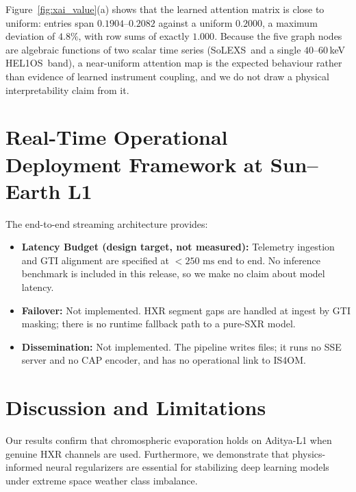 \documentclass[11pt,a4paper,twocolumn]{article}
\newcommand{\solexs}{SoLEXS}
\newcommand{\helos}{HEL1OS}
\begin{document}
Figure~\ref{fig:xai_value}(a) shows that the learned attention matrix is close to uniform: entries span $0.1904$--$0.2082$ against a uniform $0.2000$, a maximum deviation of $4.8\%$, with row sums of exactly $1.000$. Because the five graph nodes are algebraic functions of two scalar time series (\solexs\ and a single $40$--$60$\,keV \helos\ band), a near-uniform attention map is the expected behaviour rather than evidence of learned instrument coupling, and we do not draw a physical interpretability claim from it.

\section{Real-Time Operational Deployment Framework at Sun--Earth L1}
\label{sec:deployment}

The end-to-end streaming architecture provides:
\begin{itemize}
    \item \textbf{Latency Budget (design target, not measured):} Telemetry ingestion and GTI alignment are specified at $<250\text{ ms}$ end to end. No inference benchmark is included in this release, so we make no claim about model latency.
    \item \textbf{Failover:} Not implemented. HXR segment gaps are handled at ingest by GTI masking; there is no runtime fallback path to a pure-SXR model.
    \item \textbf{Dissemination:} Not implemented. The pipeline writes files; it runs no SSE server and no CAP encoder, and has no operational link to IS4OM.
\end{itemize}

\section{Discussion and Limitations}
\label{sec:discussion}

Our results confirm that chromospheric evaporation holds on Aditya-L1 when genuine HXR channels are used. Furthermore, we demonstrate that physics-informed neural regularizers are essential for stabilizing deep learning models under extreme space weather class imbalance.
\end{document}

